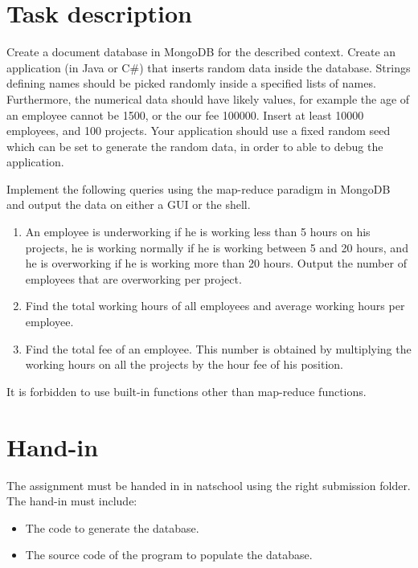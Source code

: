 \documentclass[10pt,a4paper]{article}
\begin{document}
\section*{Task description}
Create a document database in MongoDB for the described context. Create an application (in Java or C\#) that inserts random data inside the database. Strings defining names should be picked randomly inside a specified lists of names. Furthermore, the numerical data should have likely values, for example the age of an employee cannot be 1500, or the our fee 100000. Insert at least 10000 employees, and 100 projects. Your application should use a fixed random seed which can be set to generate the random data, in order to able to debug the application.

Implement the following queries using the map-reduce paradigm in MongoDB and output the data on either a GUI or the shell.

\begin{enumerate}
	\item An employee is underworking if he is working less than 5 hours on his projects, he is working normally if he is working between 5 and 20 hours, and he is overworking if he is working more than 20 hours. Output the number of employees that are overworking per project.
	\item Find the total working hours of all employees and average working hours per employee.
	\item Find the total fee of an employee. This number is obtained by multiplying the working hours on all the projects by the hour fee of his position.
\end{enumerate}

It is forbidden to use built-in functions other than map-reduce functions.

\section*{Hand-in}
The assignment must be handed in in natschool using the right submission folder. The hand-in must include:
\begin{itemize}
	\item The code to generate the database.
	\item The source code of the program to populate the database.
\end{itemize}
\end{document}
